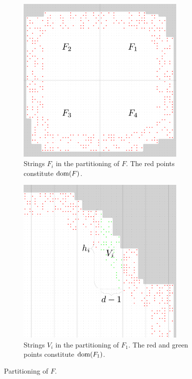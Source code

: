 \documentclass[11pt, letterpaper]{article}
\theoremstyle{plain}
\theoremstyle{definition}
\theoremstyle{remark}
\begin{document}
\begin{figure}[h!]
    \centering
    \begin{subfigure}[t]{0.45\textwidth}
        \centering
        
        \includegraphics[width=0.9\textwidth]{drawings/quarter_split}
        \caption{Strings $F_i$ in the partitioning of $F$. The red points constitute $\operatorname*{dom}(F)$.}
        \label{figure:quarter_split}
    \end{subfigure}%
    \hfill
    \begin{subfigure}[t]{0.45\textwidth}
        \centering
        \includegraphics[width=0.9\textwidth]{drawings/periphery_decomposition}
        \caption{Strings $V_i$ in the partitioning of $F_1$. The red and green points constitute $\operatorname*{dom}(F_1)$.}
        \label{figure:periphery_decomposition}
    \end{subfigure}
    \caption{Partitioning of $F$. }
\end{figure}
\end{document}
